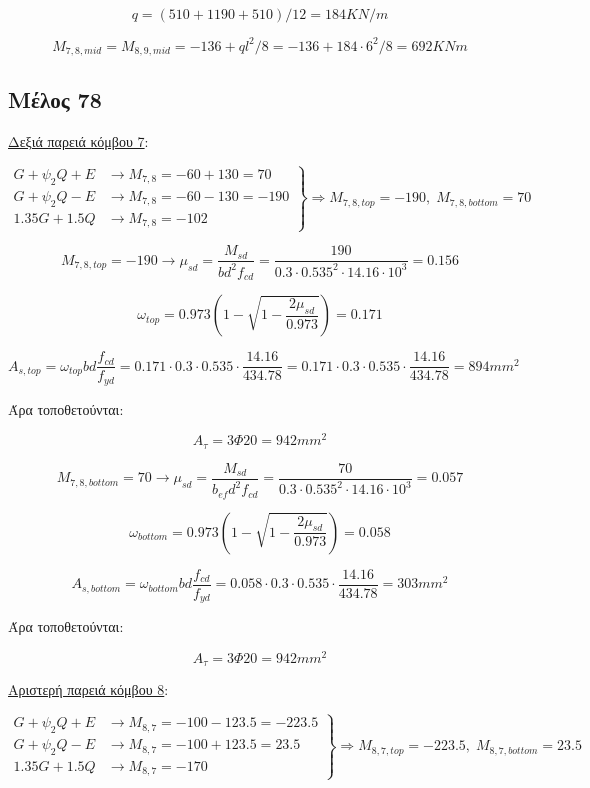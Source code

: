 \[
q = (510+ 1190 +510)/12 = 184 KN/m
\]

\[
M_{7,8,mid} = M_{8,9,mid} = - 136 + ql^2/8 = -136 + 184\cdot6^2/8 = 692 KNm
\]

\subsection{Μέλος 78}
\noindent
\underline{Δεξιά παρειά κόμβου 7}:

\[
\left.
   \begin{array}{ll}
     G+\psi_2 Q + Ε & \rightarrow M_{7,8} = -60+130 = 70 \\
     G+\psi_2 Q - Ε & \rightarrow M_{7,8} = -60-130 = -190 \\
     1.35G + 1.5Q     & \rightarrow M_{7,8} = -102
   \end{array}
\right\} \Rightarrow M_{7,8,top} = -190,\; M_{7,8,bottom} = 70
\]

\[
M_{7,8,top} = -190 \rightarrow \mu_{sd} = \dfrac{M_{sd}}{b d^2 f_{cd}} = \dfrac{190}{0.3\cdot0.535^2\cdot14.16\cdot10^3} = 0.156
\]

\[
\omega_{top} = 0.973\left( 1 - \sqrt{1 - \dfrac{2\mu_{sd}}{0.973}} \right) = 0.171
\]

\[
A_{s,top} = \omega_{top}b d \dfrac{f_{cd}}{f_{yd}} = 0.171\cdot 0.3 \cdot 0.535 \cdot \dfrac{14.16}{434.78} = 0.171\cdot 0.3 \cdot 0.535 \cdot \dfrac{14.16}{434.78} = 894mm^2
\]

\noindent
Άρα τοποθετούνται:

\[
A_{\tau} = 3\Phi20 = 942mm^2
\]

\[
M_{7,8,bottom} = 70 \rightarrow \mu_{sd} = \dfrac{M_{sd}}{b_{ef} d^2 f_{cd}} = \dfrac{70}{0.3\cdot0.535^2\cdot14.16\cdot10^3} = 0.057
\]

\[
\omega_{bottom} = 0.973\left( 1 - \sqrt{1 - \dfrac{2\mu_{sd}}{0.973}} \right) = 0.058
\]

\[
A_{s,bottom} = \omega_{bottom}b d \dfrac{f_{cd}}{f_{yd}} = 0.058\cdot 0.3 \cdot 0.535 \cdot \dfrac{14.16}{434.78} = 303mm^2
\]

\noindent
Άρα τοποθετούνται:

\[
A_{\tau} = 3\Phi20 = 942mm^2
\]

\noindent
\underline{Αριστερή παρειά κόμβου 8}:

\[
\left.
   \begin{array}{ll}
       G+\psi_2 Q + Ε & \rightarrow M_{8,7} = -100-123.5 = -223.5 \\
       G+\psi_2 Q - Ε & \rightarrow M_{8,7} = -100+123.5 = 23.5 \\
       1.35G + 1.5Q     & \rightarrow M_{8,7} = -170
   \end{array}
\right \} \Rightarrow M_{8,7,top} = -223.5,\; M_{8,7,bottom} = 23.5
\]

